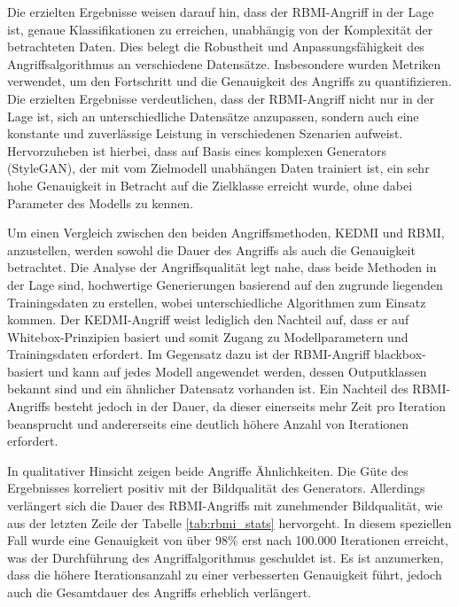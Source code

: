 Die erzielten Ergebnisse weisen darauf hin, dass der \glqq RBMI\grqq-Angriff in der Lage ist, genaue Klassifikationen zu erreichen, unabhängig von der Komplexität der betrachteten Daten. Dies belegt die Robustheit und Anpassungsfähigkeit des Angriffsalgorithmus an verschiedene Datensätze. Insbesondere wurden Metriken verwendet, um den Fortschritt und die Genauigkeit des Angriffs zu quantifizieren. Die erzielten Ergebnisse verdeutlichen, dass der \glqq RBMI\grqq-Angriff nicht nur in der Lage ist, sich an unterschiedliche Datensätze anzupassen, sondern auch eine konstante und zuverlässige Leistung in verschiedenen Szenarien aufweist. Hervorzuheben ist hierbei, dass auf Basis eines komplexen Generators (StyleGAN), der mit vom Zielmodell unabhängen Daten trainiert ist, ein sehr hohe Genauigkeit in Betracht auf die Zielklasse erreicht wurde, ohne dabei Parameter des Modells zu kennen.

Um einen Vergleich zwischen den beiden Angriffsmethoden, KEDMI und RBMI, anzustellen, werden sowohl die Dauer des Angriffs als auch die Genauigkeit betrachtet. Die Analyse der Angriffsqualität legt nahe, dass beide Methoden in der Lage sind, hochwertige Generierungen basierend auf den zugrunde liegenden Trainingsdaten zu erstellen, wobei unterschiedliche Algorithmen zum Einsatz kommen. Der KEDMI-Angriff weist lediglich den Nachteil auf, dass er auf Whitebox-Prinzipien basiert und somit Zugang zu Modellparametern und Trainingsdaten erfordert. Im Gegensatz dazu ist der RBMI-Angriff blackbox-basiert und kann auf jedes Modell angewendet werden, dessen Outputklassen bekannt sind und ein ähnlicher Datensatz vorhanden ist. Ein Nachteil des RBMI-Angriffs besteht jedoch in der Dauer, da dieser einerseits mehr Zeit pro Iteration beansprucht und andererseits eine deutlich höhere Anzahl von Iterationen erfordert.

In qualitativer Hinsicht zeigen beide Angriffe Ähnlichkeiten. Die Güte des Ergebnisses korreliert positiv mit der Bildqualität des Generators. Allerdings verlängert sich die Dauer des RBMI-Angriffs mit zunehmender Bildqualität, wie aus der letzten Zeile der Tabelle \ref{tab:rbmi_stats} hervorgeht. In diesem speziellen Fall wurde eine Genauigkeit von über 98\% erst nach 100.000 Iterationen erreicht, was der Durchführung des Angriffalgorithmus geschuldet ist. Es ist anzumerken, dass die höhere Iterationsanzahl zu einer verbesserten Genauigkeit führt, jedoch auch die Gesamtdauer des Angriffs erheblich verlängert.
